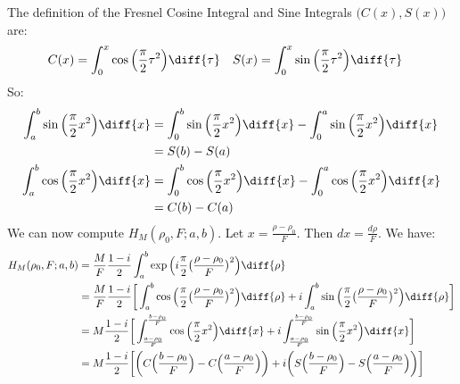 \documentclass[crop=false,class=article,oneside]{standalone}
\begin{document}
        The definition of the Fresnel Cosine Integral and
        Sine Integrals $\big(C(x),S(x)\big)$ are:
        \begin{align*}
            C(x)
            &=\int_{0}^{x}\cos
                \Big(\frac{\pi}{2}\tau^{2}\Big)\diff{\tau}
            &
            S(x)
            &=\int_{0}^{x}\sin
                \Big(\frac{\pi}{2}\tau^{2}\Big)\diff{\tau}
        \end{align*}
        So:
        \begin{align*}
        \int_{a}^{b}\sin\Big(\frac{\pi}{2}x^{2}\Big)\diff{x}
        &=\int_{0}^{b}\sin\Big(\frac{\pi}{2}x^{2}\Big)\diff{x}-
        \int_{0}^{a}\sin\Big(\frac{\pi}{2}x^{2}\Big)\diff{x}\\
        &=S(b)-S(a)\\
        \int_{a}^{b}\cos\Big(\frac{\pi}{2}x^{2}\Big)\diff{x}
        &=\int_{0}^{b}\cos\Big(\frac{\pi}{2}x^{2}\Big)\diff{x}-\int_{0}^{a}\cos\Big(\frac{\pi}{2}x^{2}\Big)\diff{x}\\
        &=C(b)-C(a)
        \end{align*}
        We can now compute
        $H_{M}(\rho_0,F;a,b)$.
        Let $x=\frac{\rho-\rho_0}{F}$. Then $dx = \frac{d\rho}{F}$.
        We have:
        \begin{align*}
            H_{M}(\rho_0,F;a,b)
            &=\frac{M}{F}\frac{1-i}{2}
                \int_{a}^{b}
                \exp\Big(i\frac{\pi}{2}
                \big(\frac{\rho-\rho_0}{F}\big)^{2}\Big)
            \diff{\rho}\\
            &=\frac{M}{F}\frac{1-i}{2}
                \bigg[\int_{a}^{b}
                \cos\Big(\frac{\pi}{2}
                \big(\frac{\rho-\rho_0}{F}\big)^{2}\Big)
            \diff{\rho}+
            i\int_{a}^{b}
                \sin\Big(\frac{\pi}{2}
                \big(\frac{\rho-\rho_0}{F}\big)^{2}\Big)
                \diff{\rho}\bigg]\\
            &=M\frac{1-i}{2}\bigg[
                \int_{\frac{a-\rho_0}{F}}^{\frac{b-\rho_0}{F}}
                \cos\Big(\frac{\pi}{2}x^{2}\Big)\diff{x}+
            i\int_{\frac{a-\rho_0}{F}}^{\frac{b-\rho_0}{F}}
                \sin\Big(\frac{\pi}{2}x^{2}\Big)\diff{x}
            \bigg]\\
            &=M\frac{1-i}{2}
                \bigg[\bigg(C\Big(\frac{b-\rho_{0}}{F}\Big)-
                    C\Big(\frac{a-\rho_0}{F}\Big)\bigg)
                +i\bigg(S\Big(\frac{b-\rho_0}{F}\Big)-
                    S\Big(\frac{a-\rho_0}{F}\Big)\bigg)\bigg]
        \end{align*}
\end{document}
